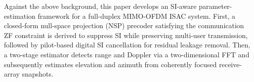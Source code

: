 \documentclass[conference]{IEEEtran}
\begin{document}
Against the above background, this paper develops an SI-aware parameter-estimation framework for a full-duplex MIMO-OFDM ISAC system. First, a closed-form null-space projection (NSP) precoder satisfying the communication ZF constraint is derived to suppress SI while preserving multi-user transmission, followed by pilot-based digital SI cancellation for residual leakage removal. Then, a two-stage estimator detects range and Doppler via a two-dimensional FFT and subsequently estimates elevation and azimuth from coherently focused receive-array snapshots.


\end{document}
